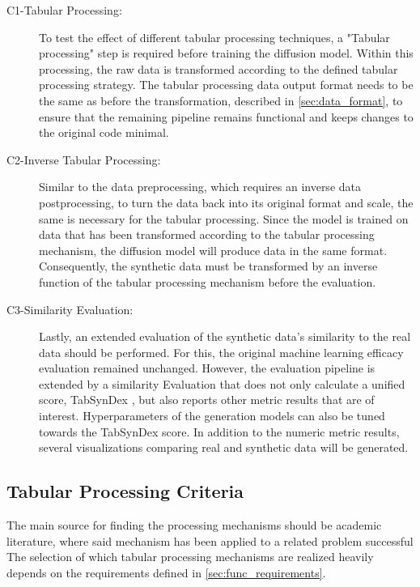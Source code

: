 \begin{description}
    \item[C1-Tabular Processing:] To test the effect of different tabular processing techniques, a "Tabular processing" step is required before training the diffusion model.
    Within this processing, the raw data is transformed according to the defined tabular processing strategy.
    The tabular processing data output format needs to be the same as before the transformation, described in \autoref{sec:data_format}, to ensure 
    that the remaining pipeline remains functional and keeps changes to the original code minimal.
    \item[C2-Inverse Tabular Processing:] Similar to the data preprocessing, which requires an inverse data postprocessing, to turn the data back into its original format and scale, the same is necessary for the tabular processing.
    Since the model is trained on data that has been transformed according to the tabular processing mechanism, the diffusion model will produce data in the same format.
    Consequently, the synthetic data must be transformed by an inverse function of the tabular processing mechanism before the evaluation.
    \item[C3-Similarity Evaluation:] Lastly, an extended evaluation of the synthetic data's similarity to the real data should be performed.
    For this, the original machine learning efficacy evaluation remained unchanged.
    However, the evaluation pipeline is extended by a similarity Evaluation that does not only calculate a unified score, TabSynDex \cite{chundawat2022UniversalMetricRobust}, but also reports other metric results that are of interest.
    Hyperparameters of the generation models can also be tuned towards the TabSynDex score.
    In addition to the numeric metric results, several visualizations comparing real and synthetic data will be generated.
\end{description}

\subsection{Tabular Processing Criteria}
\label{ch:Concept-criteria}

The main source for finding the processing mechanisms should be academic literature, where said mechanism has been applied to a related problem successful
The selection of which tabular processing mechanisms are realized heavily depends on the requirements defined in \autoref{sec:func_requirements}.

